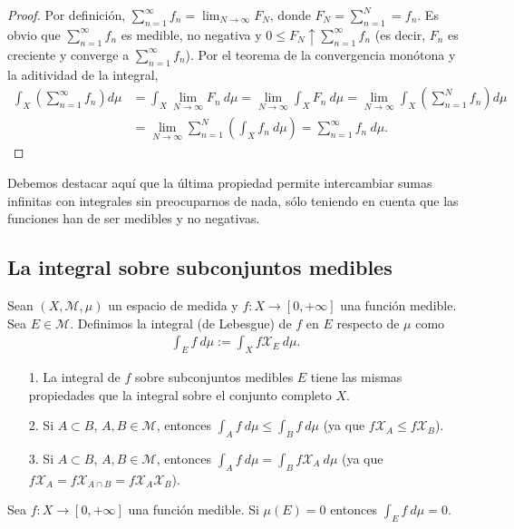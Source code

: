 \begin{proof}
    Por definición, $\sum_{n=1}^{\infty}{f_n} = \lim_{N \to \infty}{F_N}$, donde $F_N = \sum_{n=1}^{N} = f_n$. Es obvio que $\sum_{n=1}^{\infty}{f_n}$ es medible, no negativa y $0 \leq F_N \uparrow \sum_{n=1}^{\infty}{f_n}$ (es decir, $F_n$ es creciente y converge a $\sum_{n=1}^{\infty}{f_n}$). Por el teorema de la convergencia monótona y la aditividad de la integral,
    \begin{align*}
        \int_{X}{\left( \sum_{n=1}^{\infty}{f_n }\right) d\mu} & = \int_{X}{\lim_{N \to \infty}{F_n} \ d \mu} = \lim_{N \to \infty}{\int_{X}{F_n \ d\mu}} = \lim_{N \to \infty}{\int_{X}{\left( \sum_{n=1}^{N}{f_n} \right) d\mu}} \\
                                                               & = \lim_{N \to \infty}{\sum_{n=1}^{N}{\left( \int_{X}{f_n \ d\mu}\right)}} = \sum_{n=1}^{\infty}{f_n \ d\mu}.
    \end{align*}
\end{proof}

Debemos destacar aquí que la última propiedad permite intercambiar sumas infinitas con integrales sin preocuparnos de nada, sólo teniendo en cuenta que las funciones han de ser medibles y no negativas.

\subsection{La integral sobre subconjuntos medibles}

\begin{defi}
    Sean $(X, \mathcal{M}, \mu)$ un espacio de medida y $f: X \longrightarrow [0,+\infty]$ una función medible. Sea $E \in \mathcal{M}$. Definimos la integral (de Lebesgue) de $f$ en $E$ respecto de $\mu$ como
    \begin{align*}
        \int_{E}{f \ d\mu} := \int_{X}{f \mathcal{X}_E \ d\mu}.
    \end{align*}
\end{defi}

\begin{obs}
    \begin{enumerate}
        \item[1.] La integral de $f$ sobre subconjuntos medibles $E$ tiene las mismas propiedades que la integral sobre el conjunto completo $X$.
        \item[2.] Si $A \subset B$, $A,B \in \mathcal{M}$, entonces $\int_{A}{f \ d\mu} \leq \int_{B}{f \ d\mu}$ (ya que $f\mathcal{X}_A \leq f\mathcal{X}_B$).
        \item[3.] Si $A \subset B$, $A,B \in \mathcal{M}$, entonces $\int_{A}{f \ d\mu} = \int_{B}{f \mathcal{X}_A \ d\mu}$ (ya que $f\mathcal{X}_A = f\mathcal{X}_{A \cap B} = f\mathcal{X}_A\mathcal{X}_B$).
    \end{enumerate}
\end{obs}
\begin{prop}
    Sea $f: X \longrightarrow [0,+\infty]$ una función medible. Si $\mu(E) = 0$ entonces $\int_{E}{f \ d\mu} = 0$.
\end{prop}


